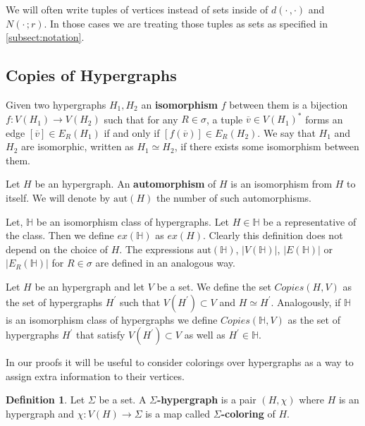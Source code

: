 \documentclass[12pt,notitlepage,a4paper]{article}
\theoremstyle{definition}
\newtheorem{definition}{Definition}[section]
\newcommand{\aut}{\mathrm{aut}}
\begin{document}
We will often write tuples of vertices instead of sets
inside of $d(\cdot\, , \cdot)$ and $N(\cdot\, ;r)$. In those cases
we are treating those tuples as sets as specified in
\cref{subsect:notation}. 

\subsection{Copies of Hypergraphs}

Given two hypergraphs $H_1, H_2$ an \textbf{isomorphism} 
$f$ between them is a bijection $f: V(H_1)\rightarrow V(H_2)$
such that for any $R\in \sigma$, a tuple $\overline{v}\in V(H_1)^*$
forms an edge $[\overline{v}]\in E_R(H_1)$ if and only
if $[f(\overline{v})]\in E_R(H_2)$. We say that $H_1$ and
$H_2$ are isomorphic, written as $H_1\simeq H_2$, if there exists
some isomorphism between them.\par

Let $H$ be an hypergraph. An \textbf{automorphism} of $H$
is an isomorphism from $H$ to itself. We will denote by
$\aut(H)$ the number of such automorphisms. \par

Let, $\mathbb{H}$ be an isomorphism class of hypergraphs. Let
$H\in \mathbb{H}$ be a representative of the class. 
Then we define $ex(\mathbb{H})$ as $ex(H)$. Clearly this definition
does not depend on the choice of $H$. The expressions
$\aut(\mathbb{H})$,
$|V(\mathbb{H})|$, $|E(\mathbb{H})|$ or
$|E_R(\mathbb{H})|$ for $R\in \sigma$ are defined 
in an analogous way.\par 

Let $H$ be an hypergraph and let $V$ be a set. We define the
set $Copies(H,V)$ as the set of hypergraphs $H^\prime$ such that
$V(H^\prime)\subset V$ and $H\simeq H^\prime$. Analogously, if
$\mathbb{H}$ is an isomorphism class of hypergraphs we define
$Copies(\mathbb{H},V)$ as the set of hypergraphs $H^\prime$ 
that satisfy
$V(H^\prime)\subset V$ as well as $H^\prime \in \mathbb{H}$.   \par

In our proofs it will be useful to consider colorings over 
hypergraphs as a way to assign extra information to their 
vertices. 

\begin{definition} \label{def:color}
	Let $\Sigma$ be a set. A \textbf{$\Sigma$-hypergraph}
	is a pair $(H, \chi)$ where $H$ is an hypergraph
	and $\chi: V(H)\rightarrow \Sigma$ is a map 
	called \textbf{$\Sigma$-coloring} of $H$.
\end{definition}
\end{document}
